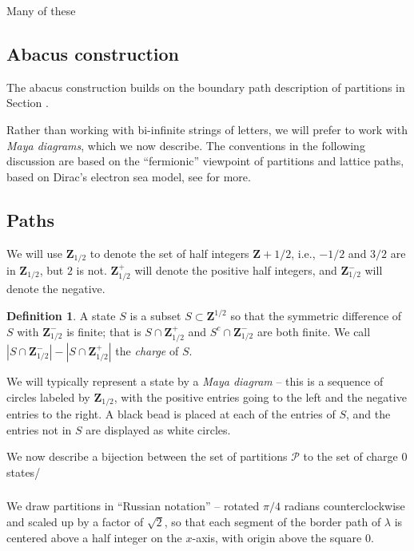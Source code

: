 \documentclass{amsart}[12pt]
\theoremstyle{definition}
\newtheorem{definition}[dummy]{Definition}
\newcommand{\Z}{\mathbf{Z}}
\begin{document}
Many of these

\subsection{Abacus construction}

The abacus construction builds on the boundary path description of partitions in Section .

Rather than working with bi-infinite strings of letters, we will prefer to work with \emph{Maya diagrams}, which we now describe.  The conventions in the following discussion are based on the ``fermionic'' viewpoint of partitions and lattice paths, based on Dirac's electron sea model, see \cite{KR} for more. 


\subsection{Paths}

We will use $\Z_{1/2}$ to denote the set of half integers $\Z+1/2$, i.e., $-1/2$ and $3/2$ are in $\Z_{1/2}$, but $2$ is not.  $\Z_{1/2}^+$ will denote the positive half integers, and $\Z_{1/2}^-$ will denote the negative.



\begin{definition}
A state $S$ is a subset $S\subset \Z^{1/2}$ so that the symmetric difference of $S$ with $\Z^-_{1/2}$ is finite; that is $S\cap\Z^+_{1/2}$ and $S^c\cap \Z^-_{1/2}$ are both finite.  We call $|S\cap \Z^-_{1/2}|-|S\cap \Z^+_{1/2}|$ the \emph{charge} of $S$.

We will typically represent a state by a \emph{Maya diagram} -- this is a sequence of circles labeled by $\Z_{1/2}$, with the positive entries going to the left and the negative entries to the right.  A black bead is placed at each of the entries of $S$, and the entries not in $S$ are displayed as white circles.
\end{definition}

We now describe a bijection between the set of partitions $\mathcal{P}$ to the set of charge 0 states/


\subsubsection{}
We draw partitions in ``Russian notation'' -- rotated $\pi/4$ radians counterclockwise and scaled up
by a factor of $\sqrt{2}$, so that each segment of the border path of $\lambda$ is centered above a half integer on the $x$-axis, with origin above the square 0.
\end{document}
